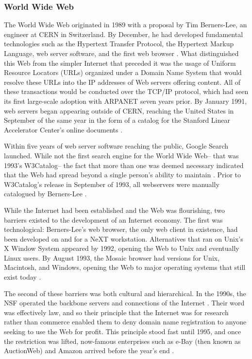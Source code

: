 \documentclass[journal]{IEEEtran}
\begin{document}
\subsubsection{World Wide Web}
The World Wide Web originated in 1989 with a proposal by Tim Berners-Lee, an engineer at CERN in Switzerland. By December, he had developed fundamental technologies such as the Hypertext Transfer Protocol, the Hypertext Markup Language, web server software, and the first web browser \cite{bernersleehttp}\cite{bernersleewebsoftware}. What distinguished this Web from the simpler Internet that preceded it was the usage of Uniform Resource Locators (URLs) organized under a Domain Name System that would resolve these URLs into the IP addresses of Web servers offering content. All of these transactions would be conducted over the TCP/IP protocol, which had seen its first large-scale adoption with ARPANET seven years prior. By January 1991, web servers began appearing outside of CERN, reaching the United States in September of the same year in the form of a catalog for the Stanford Linear Accelerator Center's online documents \cite{firstwebservers}.

Within five years of web server software reaching the public, Google Search launched. While not the first search engine for the World Wide Web-- that was 1993's W3Catalog-- the fact that more than one was deemed necessary indicated that the Web had spread beyond a single person's ability to maintain \cite{w3catalog}. Prior to W3Catalog's release in September of 1993, all webservers were manually catalogued by Berners-Lee \cite{bernersleewebcatalog}.

While the Internet had been established and the Web was flourishing, two barriers existed to the development of an Internet economy. The first was technological: Berners-Lee's web browser, the only web client in existence, had been developed on and for a NeXT workstation. Alternatives that ran on Unix's X Window System appeared by 1992, opening the Web to Unix and eventually Linux users. By August 1993, the Mosaic browser had versions for Unix, Macintosh, and Windows, opening the Web to major operating systems that still exist today \cite{mosaicbrowser}.

The second of these barriers was both cultural and hierarchical. In the 1990s, the NSF operated the backbone servers and connections of the Internet \cite{nsfbackbone}. Their word was effectively law, and so their principle that the Internet was for research rather than commerce enabled them to deny domain name registration to anyone seeking to use the Web for profit. This principle stood fast until 1995, and once the restriction was lifted, now-famous enterprises such as e-Bay (then known as AuctionWeb) and Amazon arrived before the year's end \cite{nsfcommerceorder}.
\end{document}
